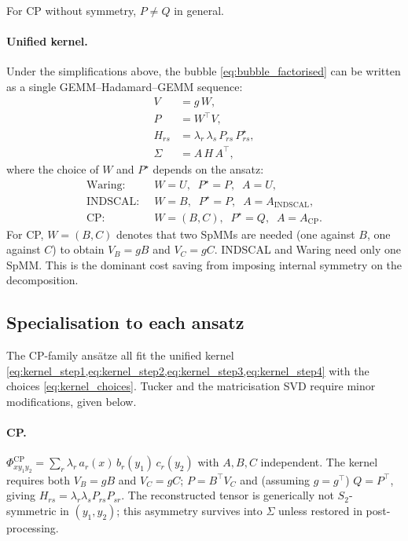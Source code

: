 For CP without symmetry, $P\ne Q$ in general.

\paragraph{Unified kernel.}
Under the simplifications above, the bubble \cref{eq:bubble_factorised}
can be written as a single GEMM--Hadamard--GEMM sequence:
\begin{align}
  \label{eq:kernel_step1}
  V       &= g\,W,                          \\
  \label{eq:kernel_step2}
  P       &= W^{\!\top} V,                     \\
  \label{eq:kernel_step3}
  H_{rs}  &= \lambda_r\,\lambda_s\,P_{rs}\,P^{\star}_{rs}, \\
  \label{eq:kernel_step4}
  \Sigma  &= A\,H\,A^{\!\top},
\end{align}
where the choice of $W$ and $P^{\star}$ depends on the ansatz:
\begin{equation}\label{eq:kernel_choices}
\begin{aligned}
  \text{Waring:}\;\; & W = U,\;\; P^\star = P, \;\; A = U, \\
  \text{INDSCAL:}\;\; & W = B,\;\; P^\star = P, \;\; A = A_{\mathrm{INDSCAL}}, \\
  \text{CP:}\;\; & W = (B,C),\;\; P^\star = Q, \;\; A = A_{\mathrm{CP}}.
\end{aligned}
\end{equation}
For CP, $W=(B,C)$ denotes that two SpMMs are needed (one against $B$,
one against $C$) to obtain $V_B=gB$ and $V_C=gC$. INDSCAL and Waring need only
one SpMM. This is the dominant cost saving from imposing internal
symmetry on the decomposition.

\subsection{Specialisation to each ansatz}
\label{ssec:phph_decomp_ansatze}

The CP-family ans\"atze all fit the unified kernel
\cref{eq:kernel_step1,eq:kernel_step2,eq:kernel_step3,eq:kernel_step4}
with the choices \cref{eq:kernel_choices}. Tucker and the
matricisation SVD require minor modifications, given below.

\paragraph{CP.}
$\Phi_{xy_1y_2}^{\mathrm{CP}} = \sum_{r} \lambda_r\,a_r(x)\,b_r(y_1)\,c_r(y_2)$
with $A,B,C$ independent. The kernel requires both $V_B = gB$ and
$V_C = gC$; $P = B^{\!\top}V_C$ and (assuming $g=g^{\!\top}$) $Q=P^{\!\top}$,
giving $H_{rs}=\lambda_r\lambda_s P_{rs}P_{sr}$. The reconstructed
tensor is generically not $S_2$-symmetric in $(y_1,y_2)$; this
asymmetry survives into $\Sigma$ unless restored in post-processing.

